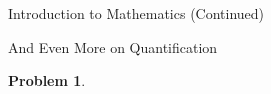 \documentclass[11pt]{article}
\theoremstyle{definition}
\newtheorem{problem}[theorem]{Problem}
\begin{document}
\begin{section}{Introduction to Mathematics (Continued)}
\begin{subsection}{And Even More on Quantification}
\begin{problem}
\begin{enumerate}

\end{enumerate}

\end{problem}

\end{subsection}

\end{section}
\end{document}
